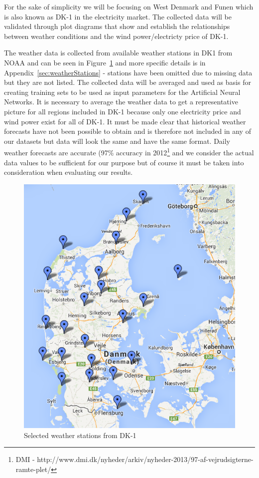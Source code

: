 For the sake of simplicity we will be focusing on West Denmark and Funen which is also known as DK-1 in the electricity market. The collected data will be validated through plot diagrams that show and establish the relationships between weather conditions and the wind power/electricty price of DK-1.

The weather data is collected from available weather stations in DK1 from NOAA and can be seen in Figure~\ref{fig:stations4average} and more specific details is in Appendix~\ref{sec:weatherStations} - stations have been omitted due to missing data but they are not listed. The collected data will be averaged and used as basis for creating training sets to be used as input parameters for the Artificial Neural Networks. It is necessary to average the weather data to get a representative picture for all regions included in DK-1 because only one electricity price and wind power exist for all of DK-1. It must be made clear that historical weather forecasts have not been possible to obtain and is therefore not included in any of our datasets but data will look the same and have the same format. Daily weather forecasts are accurate (97\% accuracy in 2012\footnote{DMI - http://www.dmi.dk/nyheder/arkiv/nyheder-2013/97-af-vejrudsigterne-ramte-plet/} and we consider the actual data values to be sufficient for our purpose but of course it must be taken into consideration when evaluating our results.

\begin{figure}[ht!]
\centering
\includegraphics[width=0.75\linewidth]{billeder/stations4average.png}
\caption{Selected weather stations from DK-1}
\label{fig:stations4average}
\end{figure}


